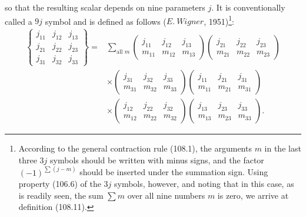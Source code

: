 so that the resulting scalar depends on nine parameters $j$. It is conventionally called a $9j$ symbol and is defined as follows ($E.\ Wigner$, 1951)\footnote{According to the general contraction rule (108.1), the arguments $m$ in the last three $3j$ symbols should be written with minus signs, and the factor $(-1)^{\sum(j-m)}$ should be inserted under the summation sign. Using property (106.6) of the $3j$ symbols, however, and noting that in this case, as is readily seen, the sum $\sum m$ over all nine numbers $m$ is zero, we arrive at definition (108.11).}:
\begin{equation}
\begin{aligned}
\left\{\begin{matrix}j_{11}&j_{12}&j_{13}\\j_{21}&j_{22}&j_{23}\\j_{31}&j_{32}&j_{33}\end{matrix}\right\}
={}&\sum_{\text{all }m}
\begin{pmatrix}j_{11}&j_{12}&j_{13}\\m_{11}&m_{12}&m_{13}\end{pmatrix}
\begin{pmatrix}j_{21}&j_{22}&j_{23}\\m_{21}&m_{22}&m_{23}\end{pmatrix}\\
&\times\begin{pmatrix}j_{31}&j_{32}&j_{33}\\m_{31}&m_{32}&m_{33}\end{pmatrix}
\begin{pmatrix}j_{11}&j_{21}&j_{31}\\m_{11}&m_{21}&m_{31}\end{pmatrix}\\
&\times\begin{pmatrix}j_{12}&j_{22}&j_{32}\\m_{12}&m_{22}&m_{32}\end{pmatrix}
\begin{pmatrix}j_{13}&j_{23}&j_{33}\\m_{13}&m_{23}&m_{33}\end{pmatrix}.
\end{aligned}
\tag{108.11}
\end{equation}

